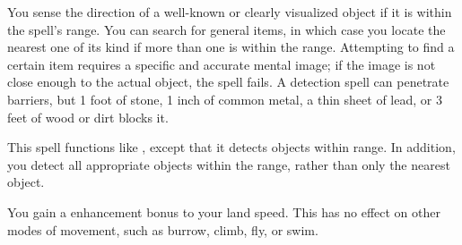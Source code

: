 \begin{spellheader}
    \spellrng{\rnglong}
    \spelldur{\durmed \dismissable}
\end{spellheader}
\begin{spelleffects}
    \spelleffect You sense the direction of a well-known or clearly visualized object if it is within the spell's range. You can search for general items, in which case you locate the nearest one of its kind if more than one is within the range. Attempting to find a certain item requires a specific and accurate mental image; if the image is not close enough to the actual object, the spell fails.
    \spellnotes A detection spell can penetrate barriers, but 1 foot of stone, 1 inch of common metal, a thin sheet of lead, or 3 feet of wood or dirt blocks it.
\end{spelleffects}
\begin{spellfooter}

\end{spellfooter}

\begin{spellheader}
    \spellrng{\rngext}
\end{spellheader}
\begin{spelleffects}
    \spelldur{\durmed \dismissable}
    \spelleffect This spell functions like , except that it detects objects within \rngext range. In addition, you detect all appropriate objects within the range, rather than only the nearest object. 
\end{spelleffects}
\begin{spellfooter}

\end{spellfooter}

\begin{spellheader}
    \spelldur{\durlong \dismissable}
\end{spellheader}
\begin{spelleffects}
    \spelleffect You gain a  enhancement bonus to your land speed. This has no effect on other modes of movement, such as burrow, climb, fly, or swim.
\end{spelleffects}
\begin{spellfooter}

\end{spellfooter}

